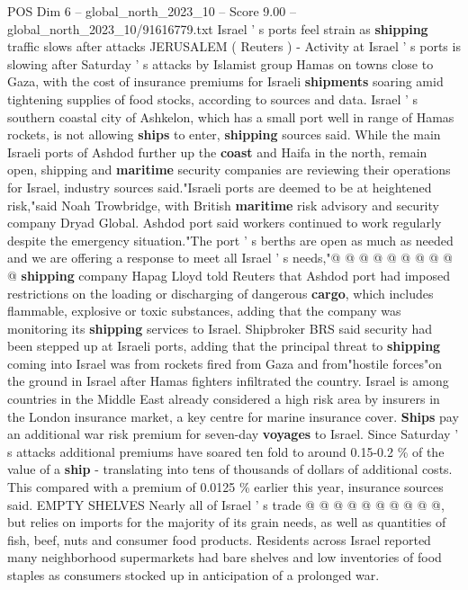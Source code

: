 \begin{textsample}{POS Dim 6 – global\_north\_2023\_10 – Score 9.00 – global\_north\_2023\_10/91616779.txt}  \label{ex:f6_pos_201}
Israel ' s ports feel strain as \textbf{shipping} traffic slows after attacks JERUSALEM ( Reuters ) - Activity at Israel ' s ports is slowing after Saturday ' s attacks by Islamist group Hamas on towns close to Gaza, with the cost of insurance premiums for Israeli \textbf{shipments} soaring amid tightening supplies of food stocks, according to sources and data.
Israel ' s southern coastal city of Ashkelon, which has a small port well in range of Hamas rockets, is not allowing \textbf{ships} to enter, \textbf{shipping} sources said.
While the main Israeli ports of Ashdod further up the \textbf{coast} and Haifa in the north, remain open, shipping and \textbf{maritime} security companies are reviewing their operations for Israel, industry sources said."Israeli ports are deemed to be at heightened risk,"said Noah Trowbridge, with British \textbf{maritime} risk advisory and security company Dryad Global.
Ashdod port said workers continued to work regularly despite the emergency situation."The port ' s berths are open as much as needed and we are offering a response to meet all Israel ' s needs,"@ @ @ @ @ @ @ @ @ @ \textbf{shipping} company Hapag Lloyd told Reuters that Ashdod port had imposed restrictions on the loading or discharging of dangerous \textbf{cargo}, which includes flammable, explosive or toxic substances, adding that the company was monitoring its \textbf{shipping} services to Israel.
Shipbroker BRS said security had been stepped up at Israeli ports, adding that the principal threat to \textbf{shipping} coming into Israel was from rockets fired from Gaza and from"hostile forces"on the ground in Israel after Hamas fighters infiltrated the country.
Israel is among countries in the Middle East already considered a high risk area by insurers in the London insurance market, a key centre for marine insurance cover. \textbf{Ships} pay an additional war risk premium for seven-day \textbf{voyages} to Israel.
Since Saturday ' s attacks additional premiums have soared ten fold to around 0.15-0.2 \% of the value of a \textbf{ship} - translating into tens of thousands of dollars of additional costs.
This compared with a premium of 0.0125 \% earlier this year, insurance sources said.
EMPTY SHELVES Nearly all of Israel ' s trade @ @ @ @ @ @ @ @ @ @, but relies on imports for the majority of its grain needs, as well as quantities of fish, beef, nuts and consumer food products.
Residents across Israel reported many neighborhood supermarkets had bare shelves and low inventories of food staples as consumers stocked up in anticipation of a prolonged war.

\end{textsample}
